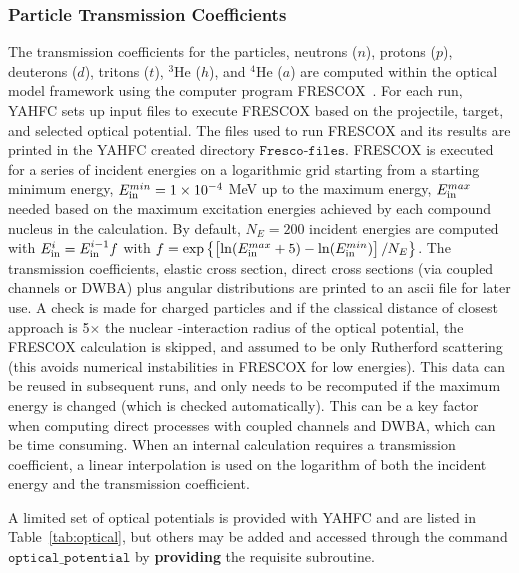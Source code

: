 \documentclass[
10pt,
showpacs,preprintnumbers,footinbib,
amsfonts,amsmath,amssymb,
aps,
prc,twocolumn,groupedaddress,superscriptaddress,
showkeys,
nofootinbib
]{revtex4-1}
\begin{document}
\subsubsection{Particle Transmission Coefficients}

The transmission coefficients for the particles, neutrons ($n$), protons ($p$), deuterons ($d$), tritons ($t$), $^3$He ($h$), and $^4$He ($a$) are computed within the optical model framework using the computer program FRESCOX~\cite{FRESCO}. For each run, YAHFC sets up input files to execute FRESCOX based on the projectile, target, and selected optical potential. The files used to run FRESCOX and its results are printed in the YAHFC created directory ${\texttt{Fresco-files}}$. FRESCOX is executed for a series of incident energies on a logarithmic grid starting from a starting minimum energy, $E_{\rm in}^{min} =1\times 10^{-4}$ MeV up to the maximum energy, $E_{\rm in}^{max}$ needed based on the maximum excitation energies achieved by each compound nucleus in the calculation. By default, $N_E=200$ incident energies are computed with $E_{\rm in}^i = E_{\rm in}^{i-1}f$ with 
$ f = \exp \left \{ \left [ \ln(E_{\rm in}^{max} + 5) - \ln(E_{\rm in}^{min}) \right ]/N_E \right \}$. The transmission coefficients, elastic cross section, direct cross sections (via coupled channels or DWBA) plus angular distributions are printed to an ascii file for later use. A check is made for charged particles and if the classical distance of closest approach is 5$\times$ the nuclear -interaction radius of the optical potential, the FRESCOX calculation is skipped, and assumed to be only Rutherford scattering (this avoids numerical instabilities in FRESCOX for low energies).  This data can be reused in subsequent runs, and only needs to be recomputed if the maximum energy is changed (which is checked automatically). This can be a key factor when computing direct processes with coupled channels and DWBA, which can be time consuming. When an internal calculation requires a transmission coefficient, a linear interpolation is used on the logarithm of both the incident energy and the transmission coefficient. 

A limited set of optical potentials is provided with YAHFC and are listed in Table~\ref{tab:optical}, but others may be added and accessed through the command ${\texttt{optical\_potential}}$ by {\bf providing} the requisite subroutine. 
\end{document}
